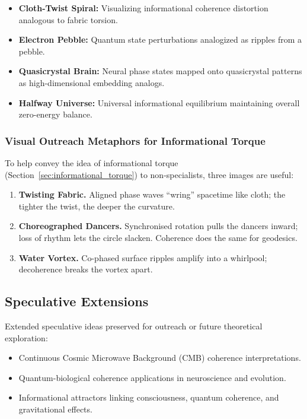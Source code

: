 \begin{itemize}
    \item \textbf{Cloth-Twist Spiral:} Visualizing informational coherence distortion analogous to fabric torsion.
    \item \textbf{Electron Pebble:} Quantum state perturbations analogized as ripples from a pebble.
    \item \textbf{Quasicrystal Brain:} Neural phase states mapped onto quasicrystal patterns as high-dimensional embedding analogs.
    \item \textbf{Halfway Universe:} Universal informational equilibrium maintaining overall zero-energy balance.
\end{itemize}

\subsubsection{Visual Outreach Metaphors for Informational Torque}
To help convey the idea of informational torque (Section~\ref{sec:informational_torque}) to non-specialists, three images are useful:

\begin{enumerate}[label=(\alph*)]
\item \textbf{Twisting Fabric.}  
      Aligned phase waves ``wring'' spacetime like cloth; the tighter the twist, the deeper the curvature.

\item \textbf{Choreographed Dancers.}  
      Synchronised rotation pulls the dancers inward; loss of rhythm lets the circle slacken. Coherence does the same for geodesics.

\item \textbf{Water Vortex.}  
      Co-phased surface ripples amplify into a whirlpool; decoherence breaks the vortex apart.
\end{enumerate}

\subsection{Speculative Extensions}

Extended speculative ideas preserved for outreach or future theoretical exploration:

\begin{itemize}
    \item Continuous Cosmic Microwave Background (CMB) coherence interpretations.
    \item Quantum-biological coherence applications in neuroscience and evolution.
    \item Informational attractors linking consciousness, quantum coherence, and gravitational effects.
\end{itemize}

